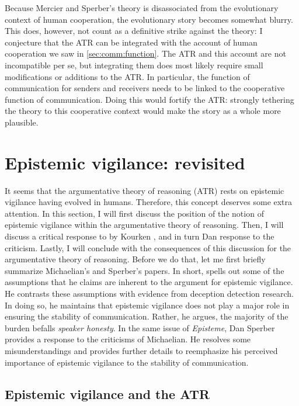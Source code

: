 Because Mercier and Sperber's theory is disassociated from the evolutionary context of human cooperation, the evolutionary story becomes somewhat blurry.
This does, however, not count as a definitive strike against the theory: I conjecture that the ATR can be integrated with the account of human cooperation we saw in \cref{sec:comm:function}. The ATR and this account are not incompatible per se, but integrating them does most likely require small modifications or additions to the ATR. In particular, the function of communication for senders and receivers needs to be linked to the cooperative function of communication.
Doing this would fortify the ATR: strongly tethering the theory to this cooperative context would make the story as a whole more plausible.

\section{Epistemic vigilance: revisited}
\label{sec:EV-scrutiny}

It seems that the argumentative theory of reasoning (ATR) rests on epistemic vigilance having evolved in humans. Therefore, this concept deserves some extra attention.
In this section, I will first discuss the position of the notion of epistemic vigilance within the argumentative theory of reasoning. Then, I will discuss a critical response to \citet{Sperber10} by Kourken \citet{Michaelian13}, and in turn Dan  response to the criticism. Lastly, I will conclude with the consequences of this discussion for the argumentative theory of reasoning.
Before we do that, let me first briefly summarize Michaelian's and Sperber's papers. In short, \citet{Michaelian13} spells out some of the assumptions that he claims are inherent to the argument for epistemic vigilance. He contrasts these assumptions with evidence from deception detection research. In doing so, he maintains that epistemic vigilance does not play a major role in ensuring the stability of communication. Rather, he argues, the majority of the burden befalls \emph{speaker honesty}. In the same \citeyear{Sperber13} issue of \emph{Episteme}, Dan Sperber provides a response to the criticisms of Michaelian. He resolves some misunderstandings and provides further details to reemphasize his perceived importance of epistemic vigilance to the stability of communication.

\subsection{Epistemic vigilance and the ATR}
\label{sec:epi-vigil-atr}

